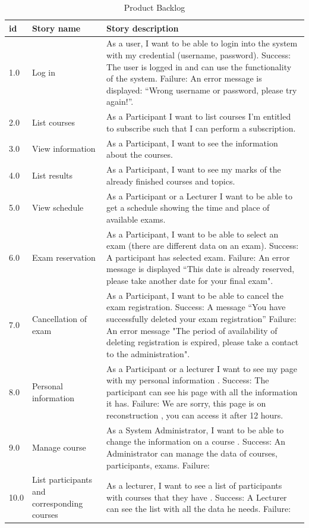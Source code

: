 \documentclass{scrartcl}
\begin{document}
  \begin{table}[H]
\begin{center}
\begin{tabular}{| p{2.5cm}| p{4cm} | p{9cm} |}
\hline
\textbf{id} & \textbf{Story name} & \textbf{Story description}\\
\hline      
	
	1.0 & Log in & As a user, I want to be able to login into the system with my credential (username, password).
 Success: The user is logged in and can use the functionality of the system.
 Failure: An error message is displayed: “Wrong username or password, please try again!”. \\ \hline
	2.0 & List courses & As a Participant I want to list courses I'm entitled to subscribe such that I can perform a subscription. \\ \hline
	3.0 & View information & As a Participant, I want to see the information about the courses. \\ \hline
	4.0 & List results & As a Participant, I want to see my marks of the already finished courses and topics. \\ \hline
	5.0 & View schedule & As a Participant or a Lecturer I want to be able to get a schedule showing the time and place of available exams. \\ \hline
	6.0 & Exam reservation & As a Participant, I want to be able to select an exam (there are different data on an exam).
 Success: A participant has selected exam.
 Failure: An error message is displayed “This date is already reserved, please take another date for your final exam". \\ \hline
	7.0 & Cancellation of exam & As a Participant, I want to be able to cancel the exam registration.
 Success: A message “You have successfully deleted your exam registration”
 Failure: An error message "The period of availability of deleting registration is expired, please take a contact to the administration". \\ \hline
	8.0 & Personal information & As a Participant or a lecturer I want to see my page with my personal information .
 Success: The participant can see his page with all the information it has.
 Failure: We are sorry, this page is on reconstruction , you can access it after 12 hours. \\ \hline
	9.0 & Manage course & As a System Administrator, I want to be able to change the information on a course .
 Success: An Administrator can manage the data of courses, participants, exams.
 Failure: \\ \hline
	10.0 & List participants and corresponding courses & As a lecturer, I want to see a list of participants with courses that they have .
 Success: A Lecturer can see the list with all the data he needs.
 Failure: \\ \hline


        
        \end{tabular}
\end{center}
\caption{Product Backlog}
\label{table2}
\end{table}
\end{document}
